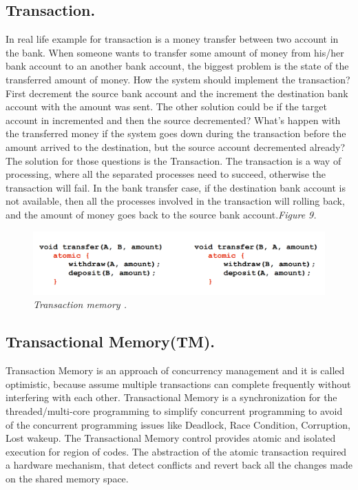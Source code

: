\documentclass[12pt]{article}
\begin{document}
\subsection{Transaction.}
In real life example for transaction is a money transfer between two account in the bank. When someone wants to transfer some amount of money from his/her bank account to an another bank account, the biggest problem is the state of the transferred amount of money. How the system should implement the transaction?  First decrement the source bank account and the increment the destination bank account with the amount was sent. The other solution could be if the target account in incremented and then the source decremented? What's happen with the transferred money if the system goes down during the transaction before the amount arrived to the destination, but the source account decremented already?\\

The solution for those questions is the Transaction. The transaction is a way of processing, where all the separated processes need to succeed, otherwise the transaction will fail. In the bank transfer case, if the destination bank account is not available, then all the processes involved in the transaction will rolling back, and the amount of money goes back to the source bank account.\textit{\color{gray}Figure 9.}\\

\begin{figure}[h!]
\centering
\includegraphics[scale=0.3]{Pictures/realLife.png}
\caption{\textit{\color{gray}Transaction memory \cite{TMvsLock}.}}
\end{figure}

\subsection{Transactional Memory(TM).}
Transaction Memory is an approach of concurrency management and it is called optimistic, because assume multiple transactions can complete frequently without interfering with each other. Transactional Memory is a synchronization for the threaded/multi-core programming to simplify concurrent programming to avoid of the concurrent programming issues like Deadlock, Race Condition, Corruption, Lost wakeup. The Transactional Memory control provides atomic and isolated execution for region of codes. The abstraction of the atomic transaction required a hardware mechanism, that detect conflicts and revert back all the changes made on the shared memory space.\\
\end{document}
